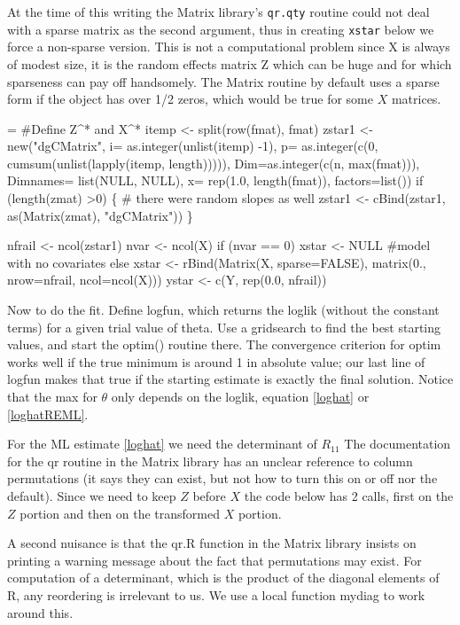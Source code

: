\documentclass{article}
\begin{document}
At the time of this writing the Matrix library's \Verb!qr.qty! routine  %
could not deal with a sparse matrix as the second argument,
thus in creating \Verb!xstar! below we force a non-sparse version.
This is not a computational problem since X is always of modest size,
it is the random effects matrix Z which can be huge and for which
sparseness can pay off handsomely.
The Matrix routine by
default uses a sparse form if the object has over 1/2 zeros,
which would be true for some $X$ matrices.
\begin{nwchunk}
=
 #Define Z^* and X^*
 itemp <- split(row(fmat), fmat)
 zstar1 <- new("dgCMatrix", 
               i= as.integer(unlist(itemp) -1),
               p= as.integer(c(0, cumsum(unlist(lapply(itemp, length))))),
               Dim=as.integer(c(n, max(fmat))),
               Dimnames= list(NULL, NULL),
               x= rep(1.0, length(fmat)),
               factors=list())
 if (length(zmat) >0)  \{
     # there were random slopes as well
     zstar1 <- cBind(zstar1, as(Matrix(zmat), "dgCMatrix"))
 \}
 
 nfrail <- ncol(zstar1)
 nvar <- ncol(X)
 if (nvar == 0)  xstar <- NULL  #model with no covariates
 else xstar <- rBind(Matrix(X, sparse=FALSE),
                     matrix(0., nrow=nfrail, ncol=ncol(X)))
 ystar <- c(Y, rep(0.0, nfrail))
\end{nwchunk}

Now to do the fit. 
Define logfun, which returns the loglik (without the constant terms) for
a given trial value of theta.
Use a gridsearch to find the best starting values, and start the
optim() routine there.
The convergence criterion for optim works well if the true minimum is
around 1 in absolute value; our last line of logfun makes that true 
if the starting estimate is exactly the final solution.
Notice that the max for $\theta$ only depends on the loglik,
equation \ref{loghat} or \ref{loghatREML}.

For the ML estimate \ref{loghat} we need the determinant of $R_{11}$
The documentation for the qr routine in the Matrix library has an
unclear reference to column permutations (it says they can exist, but
not how to turn this on or off nor the default).  Since we need to
keep $Z$ before $X$ the code below has 2 calls, first on the $Z$
portion and then on the transformed $X$ portion.

A second nuisance is that the qr.R function in the Matrix
library insists on printing a warning message about the fact
that permutations may exist.  For computation of a determinant,
which is the product of the diagonal elements of R,
any reordering is irrelevant to us.  We use a local function
mydiag to work around this.
\end{document}
